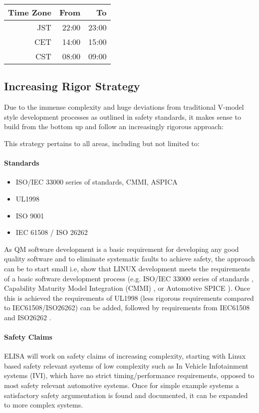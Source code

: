 \documentclass[12pt]{ElisaPaper}
\begin{document}
\begin{center}
\begin{tabular}{rrr}
	\toprule
	Time Zone & From & To\\
	\midrule
	JST & 22:00 & 23:00 \\
	CET	& 14:00 & 15:00 \\
	CST & 08:00 & 09:00 \\
	\bottomrule 
\end{tabular}
\end{center}

\subsection{Increasing Rigor Strategy}
Due to the immense complexity and huge deviations from traditional V-model style development processes as outlined in safety standards, it makes sense to build from the bottom up and follow an increasingly rigorous approach:

This strategy pertains to all areas, including but not limited to:
\paragraph{Standards}
\begin{itemize}
	\item ISO/IEC 33000 series of standards, CMMI, ASPICA \cite{ISO3300x:2015,CMMI,ASPICE}
	\item UL1998 \cite{UL1998}
	\item ISO 9001 \cite{ISO9001:2015}
	\item IEC 61508 / ISO 26262 \cite{IEC61508:2010,ISO26262:2018}
\end{itemize}
As QM software development is a basic requirement for developing any good quality software and to eliminate systematic faults to achieve safety, the approach can be to start small i.e, show that LINUX development meets the requirements of a basic software development process (e.g. ISO/IEC 33000 series of standards \cite{ISO3300x:2015}, Capability Maturity Model Integration (CMMI) \cite{CMMI}, or Automotive SPICE \cite{ASPICE}).
Once this is achieved the requirements of UL1998 \cite{UL1998} (less rigorous requirements compared to IEC61508/ISO26262) can be added, followed by requirements from IEC61508 and ISO26262 \cite{IEC61508:2010,ISO26262:2018}.
\paragraph{Safety Claims}
ELISA will work on safety claims of increasing complexity, starting with Linux based safety relevant systems of low complexity such as In Vehicle Infotainment systems (IVI), which have no strict timing/performance requirements, opposed to most safety relevant automotive systems.
Once for simple example systems a satisfactory safety argumentation is found and documented, it can be expanded to more complex systems.
\end{document}
